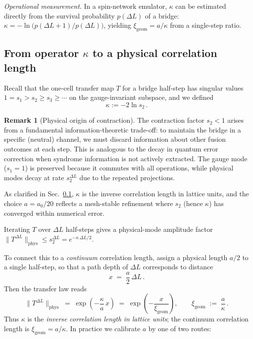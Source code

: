 \documentclass[11pt]{article}
\theoremstyle{plain}
\theoremstyle{definition}
\newtheorem{remark}[theorem]{Remark}
\begin{document}
\noindent\emph{Operational measurement.} In a spin-network emulator, $\kappa$ can be estimated directly from the survival probability $p(\Delta L)$ of a bridge: $\kappa = -\ln\!\big(p(\Delta L{+}1)/p(\Delta L)\big)$, yielding $\xi_{\mathrm{geom}}=a/\kappa$ from a single-step ratio.

\subsection{From operator \texorpdfstring{$\kappa$}{kappa} to a physical correlation length}\label{subsec:kappa-corrlen}

Recall that the one-cell transfer map $T$ for a bridge half-step has singular values $1=s_1>s_2\ge s_3\ge\cdots$ on the gauge-invariant subspace, and we defined
\begin{equation}\label{eq:kappa-def}
  \kappa := -2\ln s_2 \,.
\end{equation}

\begin{remark}[Physical origin of contraction]
  The contraction factor $s_2 < 1$ arises from a fundamental information-theoretic trade-off: to maintain the bridge in a specific (neutral) channel, we must discard information about other fusion outcomes at each step. This is analogous to the decay in quantum error correction when syndrome information is not actively extracted. The gauge mode ($s_1 = 1$) is preserved because it commutes with all operations, while physical modes decay at rate $s_2^{\Delta L}$ due to the repeated projections.
\end{remark}

As clarified in Sec.~\ref{subsec:kappa-corrlen}, $\kappa$ is the inverse correlation length in lattice units, and the choice $a=a_0/20$ reflects a mesh-stable refinement where $s_2$ (hence $\kappa$) has converged within numerical error.

Iterating $T$ over $\Delta L$ half-steps gives a physical-mode amplitude factor $\|T^{\Delta L}\|_{\mathrm{phys}} \le s_2^{\Delta L} = e^{-\kappa\,\Delta L/2}$.

To connect this to a \emph{continuum} correlation length, assign a physical length $a/2$ to a single half-step, so that a path depth of $\Delta L$ corresponds to distance
\begin{equation}
  x \;=\; \frac{a}{2}\,\Delta L \,.
\end{equation}
Then the transfer law reads
\begin{equation}\label{eq:exp-decay}
  \|T^{\Delta L}\|_{\mathrm{phys}} \;=\; \exp\!\left(-\frac{\kappa}{a}\,x\right) \;=\; \exp\!\left(-\frac{x}{\xi_{\mathrm{geom}}}\right),\qquad
  \xi_{\mathrm{geom}} \;:=\; \frac{a}{\kappa}\,.
\end{equation}
Thus $\kappa$ is the \emph{inverse correlation length in lattice units}; the continuum correlation length is $\xi_{\mathrm{geom}}=a/\kappa$. In practice we calibrate $a$ by one of two routes:
\end{document}
